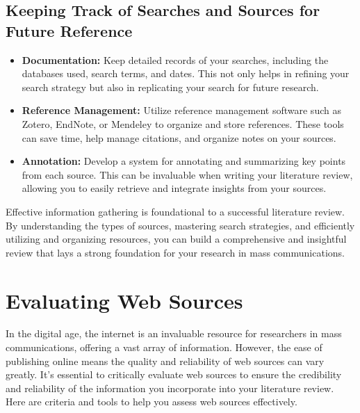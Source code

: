 \documentclass[
]{book}
\begin{document}
\hypertarget{keeping-track-of-searches-and-sources-for-future-reference}{%
\subsection*{Keeping Track of Searches and Sources for Future Reference}\label{keeping-track-of-searches-and-sources-for-future-reference}}

\begin{itemize}
\item
  \textbf{Documentation:} Keep detailed records of your searches, including the databases used, search terms, and dates. This not only helps in refining your search strategy but also in replicating your search for future research.
\item
  \textbf{Reference Management:} Utilize reference management software such as Zotero, EndNote, or Mendeley to organize and store references. These tools can save time, help manage citations, and organize notes on your sources.
\item
  \textbf{Annotation:} Develop a system for annotating and summarizing key points from each source. This can be invaluable when writing your literature review, allowing you to easily retrieve and integrate insights from your sources.
\end{itemize}

Effective information gathering is foundational to a successful literature review. By understanding the types of sources, mastering search strategies, and efficiently utilizing and organizing resources, you can build a comprehensive and insightful review that lays a strong foundation for your research in mass communications.

\hypertarget{evaluating-web-sources}{%
\section{Evaluating Web Sources}\label{evaluating-web-sources}}

In the digital age, the internet is an invaluable resource for researchers in mass communications, offering a vast array of information. However, the ease of publishing online means the quality and reliability of web sources can vary greatly. It's essential to critically evaluate web sources to ensure the credibility and reliability of the information you incorporate into your literature review. Here are criteria and tools to help you assess web sources effectively.
\end{document}
